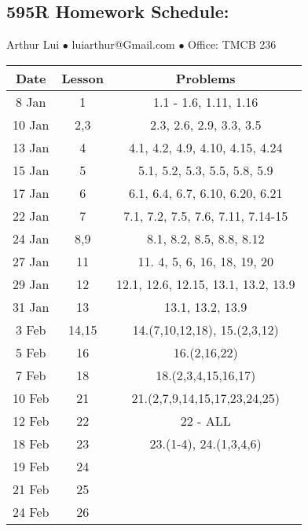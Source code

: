\documentclass{article}
\def\wl{\par \vspace{\baselineskip}}
\begin{document}
\begin{center}
  \subsection*{595R Homework Schedule:} \wl
  Arthur Lui $\bullet$ luiarthur@Gmail.com $\bullet$ Office: TMCB 236 \wl
  \begin{tabular}{|c|c|c|}                       \hline
    Date & Lesson & Problems               \\ \hline
     8 Jan & 1     & 1.1 - 1.6, 1.11, 1.16               \\ \hline
    10 Jan & 2,3   & 2.3, 2.6, 2.9, 3.3, 3.5             \\ \hline
    13 Jan & 4     & 4.1, 4.2, 4.9, 4.10, 4.15, 4.24     \\ \hline %
    15 Jan & 5     & 5.1, 5.2, 5.3, 5.5, 5.8, 5.9        \\ \hline
    17 Jan & 6     & 6.1, 6.4, 6.7, 6.10, 6.20, 6.21     \\ \hline
    22 Jan & 7     & 7.1, 7.2, 7.5, 7.6, 7.11, 7.14-15   \\ \hline
    24 Jan & 8,9   & 8.1, 8.2, 8.5, 8.8, 8.12            \\ \hline
    27 Jan & 11    & 11. 4, 5, 6, 16, 18, 19, 20         \\ \hline
    29 Jan & 12    & 12.1, 12.6, 12.15, 13.1, 13.2, 13.9 \\ \hline
    31 Jan & 13    & 13.1, 13.2, 13.9                    \\ \hline
     3 Feb & 14,15 & 14.(7,10,12,18), 15.(2,3,12)        \\ \hline
     5 Feb & 16    & 16.(2,16,22)                        \\ \hline
     7 Feb & 18    & 18.(2,3,4,15,16,17)                 \\ \hline
    10 Feb & 21    & 21.(2,7,9,14,15,17,23,24,25)        \\ \hline
    12 Feb & 22    & 22 - ALL                            \\ \hline
    18 Feb & 23    & 23.(1-4), 24.(1,3,4,6)              \\ \hline
    19 Feb & 24    &                                     \\ \hline
    21 Feb & 25    &                                     \\ \hline
    24 Feb & 26    &                                     \\ \hline

\end{tabular}
\end{center}
\end{document}

